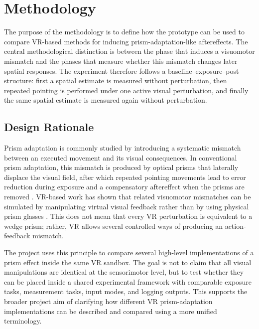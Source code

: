 \chapter{Methodology}
\label{chap:Meth}

The purpose of the methodology is to define how the prototype can be used to compare VR-based methods for inducing prism-adaptation-like aftereffects. The central methodological distinction is between the phase that induces a visuomotor mismatch and the phases that measure whether this mismatch changes later spatial responses. The experiment therefore follows a baseline--exposure--post structure: first a spatial estimate is measured without perturbation, then repeated pointing is performed under one active visual perturbation, and finally the same spatial estimate is measured again without perturbation.

\section{Design Rationale}
\label{sec:method-design-rationale}

Prism adaptation is commonly studied by introducing a systematic mismatch between an executed movement and its visual consequences. In conventional prism adaptation, this mismatch is produced by optical prisms that laterally displace the visual field, after which repeated pointing movements lead to error reduction during exposure and a compensatory aftereffect when the prisms are removed \cite{Rossetti1998Prism,frassinetti2002long,Serino2011}. VR-based work has shown that related visuomotor mismatches can be simulated by manipulating virtual visual feedback rather than by using physical prism glasses \cite{kim2017development,Ramos2019,cho2022feasibility,anan2025comparative}. This does not mean that every VR perturbation is equivalent to a wedge prism; rather, VR allows several controlled ways of producing an action-feedback mismatch.

The project uses this principle to compare several high-level implementations of a prism effect inside the same VR sandbox. The goal is not to claim that all visual manipulations are identical at the sensorimotor level, but to test whether they can be placed inside a shared experimental framework with comparable exposure tasks, measurement tasks, input modes, and logging outputs. This supports the broader project aim of clarifying how different VR prism-adaptation implementations can be described and compared using a more unified terminology.

